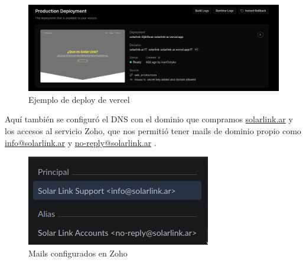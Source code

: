 \begin{figure}[H]
    \centering
    \includegraphics[width=1.2\linewidth]{web/Captura desde 2023-10-17 15-49-12.png}
    \caption{Ejemplo de deploy de vercel}
    \label{fig:enter-label}
\end{figure}

Aquí también se configuró el DNS con el dominio que compramos \href{https://solarlink.ar}{solarlink.ar} y los accesos al servicio Zoho, que nos permitió tener mails de dominio propio como \href{info@solarlink.ar}{info@solarlink.ar} y \href{no-reply@solarlink.ar}{no-reply@solarlink.ar}  .
\begin{figure}[H]
    \centering
    \includegraphics[width=0.5\linewidth]{web/Captura desde 2023-10-17 16-45-31.png}
    \caption{Mails configurados en Zoho}
    \label{fig:zoho mail}
\end{figure}